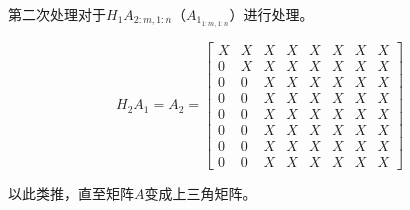 第二次处理对于$H_1A_{2:m, 1:n}$（$A_{1_{1:m, 1:n} }  $）进行处理。

\begin{equation}H_2A_1= A_{2}=\left[\begin{array}{cccccccc}X & X & X & X & X & X & X & X \\ 0 & X & X & X & X & X & X & X \\ 0 & 0 & X & X & X & X & X & X \\ 0 & 0 & X & X & X & X & X & X \\ 0 & 0 & X & X & X & X & X & X \\ 0 & 0 & X & X & X & X & X & X \\ 0 & 0 & X & X & X & X & X & X \\ 0 & 0 & X & X & X & X & X & X\end{array}\right] \end{equation}

以此类推，直至矩阵$A$变成上三角矩阵。


